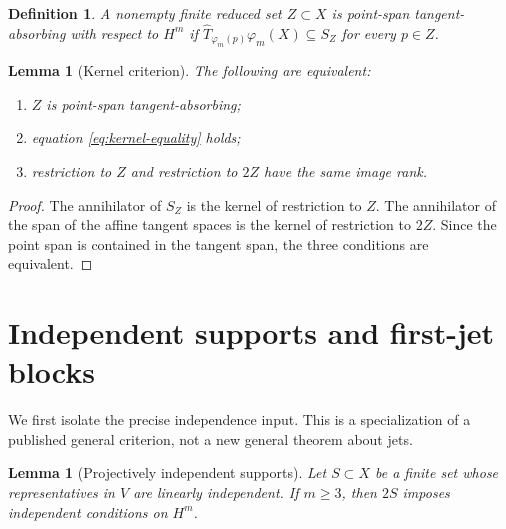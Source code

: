 \documentclass[11pt]{article}
\newtheorem{lemma}[theorem]{Lemma}
\newtheorem{definition}[theorem]{Definition}
\begin{document}
\begin{definition}
A nonempty finite reduced set $Z\subset X$ is \emph{point-span
tangent-absorbing with respect to $H^m$} if
$\widehat T_{\varphi_m(p)}\varphi_m(X)\subseteq S_Z$ for every $p\in Z$.
\end{definition}

\begin{lemma}[Kernel criterion]\label{lem:kernel}
The following are equivalent:
\begin{enumerate}[label=(\roman*)]
\item $Z$ is point-span tangent-absorbing;
\item equation \eqref{eq:kernel-equality} holds;
\item restriction to $Z$ and restriction to $2Z$ have the same image rank.
\end{enumerate}
\end{lemma}

\begin{proof}
The annihilator of $S_Z$ is the kernel of restriction to $Z$.  The
annihilator of the span of the affine tangent spaces is the kernel of
restriction to $2Z$.  Since the point span is contained in the tangent span,
the three conditions are equivalent.
\end{proof}

\section{Independent supports and first-jet blocks}\label{sec:independence}

We first isolate the precise independence input.  This is a specialization
of a published general criterion, not a new general theorem about jets.

\begin{lemma}[Projectively independent supports]\label{lem:independent-jets}
Let $S\subset X$ be a finite set whose representatives in $V$ are linearly
independent.  If $m\geq3$, then $2S$ imposes independent conditions on
$H^m$.
\end{lemma}
\end{document}
